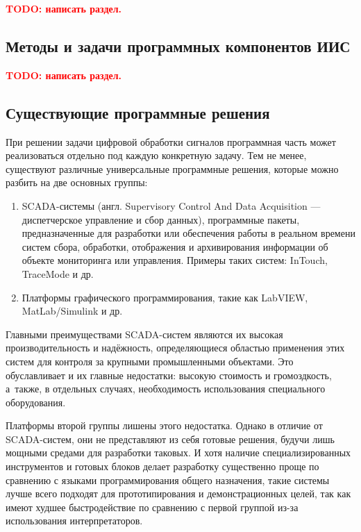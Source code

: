 \documentclass[a4paper, 14pt, titlepage]{extarticle}
\newcommand{\todo}[1]{\textbf{\textcolor{red}{TODO: #1}}}
\begin{document}
  \todo{написать раздел.}

  \subsection{Методы и задачи программных компонентов ИИС}

  \todo{написать раздел.}

  \subsection{Существующие программные решения}\label{ssec:existing}

  При решении задачи цифровой обработки сигналов программная часть может реализоваться отдельно под
  каждую конкретную задачу.
  Тем не менее, существуют различные универсальные программные решения, которые можно разбить на две
  основных группы:
  \begin{enumerate}
    \item SCADA-системы (англ. Supervisory Control And Data Acquisition — диспетчерское управление и
      сбор данных), программные пакеты, предназначенные для разработки или обеспечения работы в
      реальном времени систем сбора, обработки, отображения и архивирования информации об объекте
      мониторинга или управления. \cite{boyer-scada}
      Примеры таких систем: InTouch, TraceMode и др.
    \item Платформы графического программирования, такие как LabVIEW, MatLab/Simulink и др.
  \end{enumerate}

  Главными преимуществами SCADA-систем являются их высокая производительность и надёжность,
  определяющиеся областью применения этих систем для контроля за крупными промышленными объектами.
  Это обуславливает и их главные недостатки: высокую стоимость и громоздкость, а~также, в отдельных
  случаях, необходимость использования специального оборудования.

  Платформы второй группы лишены этого недостатка. Однако в отличие от SCADA-систем, они не
  представляют из себя готовые решения, будучи лишь мощными средами для разработки таковых.
  И хотя наличие специализированных инструментов и готовых блоков делает разработку существенно
  проще по сравнению с языками программирования общего назначения, такие системы лучше всего
  подходят для прототипирования и демонстрационных целей, так как имеют худшее быстродействие по
  сравнению с первой группой из-за использования интерпретаторов.
\end{document}
